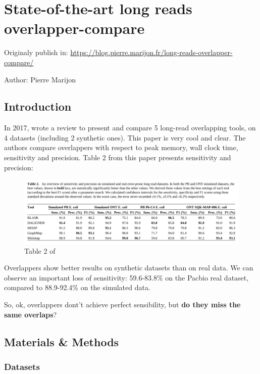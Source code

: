 \documentclass[./main.tex]{subfiles}
\begin{document}
\section{State-of-the-art long reads overlapper-compare} \label{sec:preasm:blog_post}

Originaly publish in: \url{https://blog.pierre.marijon.fr/long-reads-overlapper-compare/}

Author: Pierre Marijon

\subsection{Introduction}\label{preassembly:ovl:introduction}

In 2017, \citeauthor{ovl_bench} wrote a review \cite{ovl_bench}
to present and compare 5 long-read overlapping tools, on 4 datasets
(including 2 synthetic ones). This paper is very cool and clear. The
authors compare overlappers with respect to peak memory, wall clock
time, sensitivity and precision. Table 2 from this paper presents
sensitivity and precision:

\begin{figure}[ht]
\centering
\includegraphics[width=\textwidth]{paper/blog_post/table_res_review.png}
\caption{Table 2 of \cite{ovl_bench}}
\end{figure}

Overlappers show better results on synthetic datasets than on real data.
We can observe an important loss of sensitivity: 59.6-83.8\% on the
Pacbio real dataset, compared to 88.9-92.4\% on the simulated data.

So, ok, overlappers dont't achieve perfect sensibility, but \textbf{do
they miss the same overlaps}?

\subsection{Materials \& Methods}\label{preassembly:ovl:materials-methods}

\subsubsection{Datasets}\label{preassembly:ovl:datasets}
\end{document}
